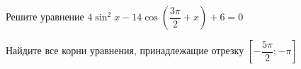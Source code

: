 \begin{ex}
	\begin{condition}
		\begin{enumcols}[label=\asbuk*)]
			\item Решите уравнение \( 4\sin^2 x - 14\cos {\left(\dfrac{3\pi}{2}+x\right)} + 6 = 0 \)
			\item Найдите все корни уравнения, принадлежащие отрезку \( \left[-\dfrac{5\pi}{2};-\pi\right] \)
		\end{enumcols}
	\end{condition}
\end{ex}
